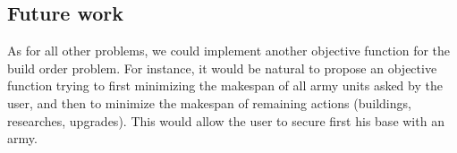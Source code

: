 \documentclass[journal]{IEEEtran}
\newcommand{\ghost}{\textsc{GHOST}\xspace}
\begin{document}
\subsection{Future work}

As  for  all other  problems,  we  could implement  another  objective
function  for the  build  order  problem. For  instance,  it would  be
natural to  propose an objective  function trying to  first minimizing
the makespan of all army units asked by the user, and then to minimize
the   makespan   of    remaining   actions   (buildings,   researches,
upgrades). This would allow the user  to secure first his base with an
army.

\end{document}
